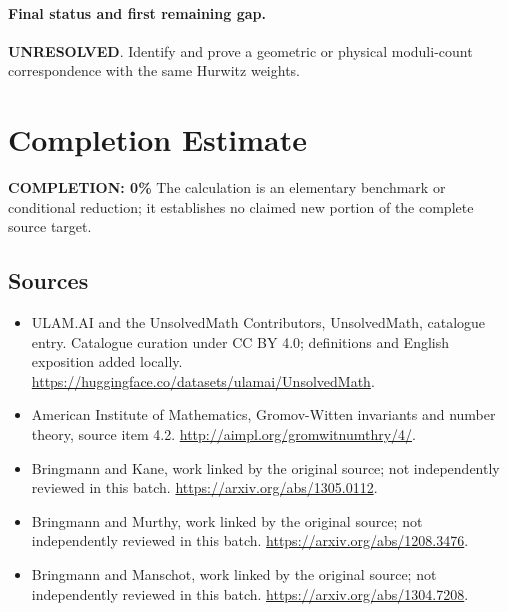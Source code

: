 \documentclass[11pt]{article}
\begin{document}
\paragraph{Final status and first remaining gap.}
\textbf{UNRESOLVED}. Identify and prove a geometric or physical moduli-count correspondence with the same Hurwitz weights.

\section{Completion Estimate}
\noindent\textbf{COMPLETION: 0\%}
The calculation is an elementary benchmark or conditional reduction; it establishes no claimed new portion of the complete source target.

\subsection{Sources}
\begin{itemize}
\item[\hypertarget{source:statement:1}{S1}] ULAM.AI and the UnsolvedMath Contributors, UnsolvedMath, catalogue entry. Catalogue curation under CC BY 4.0; definitions and English exposition added locally.
\url{https://huggingface.co/datasets/ulamai/UnsolvedMath}.
\item[\hypertarget{source:statement:2}{S2}] American Institute of Mathematics, Gromov-Witten invariants and number theory, source item 4.2.
\url{http://aimpl.org/gromwitnumthry/4/}.
\item[\hypertarget{source:statement:3}{S3}] Bringmann and Kane, work linked by the original source; not independently reviewed in this batch.
\url{https://arxiv.org/abs/1305.0112}.
\item[\hypertarget{source:statement:4}{S4}] Bringmann and Murthy, work linked by the original source; not independently reviewed in this batch.
\url{https://arxiv.org/abs/1208.3476}.
\item[\hypertarget{source:statement:5}{S5}] Bringmann and Manschot, work linked by the original source; not independently reviewed in this batch.
\url{https://arxiv.org/abs/1304.7208}.
\end{itemize}
\label{end:statement}
\end{document}
